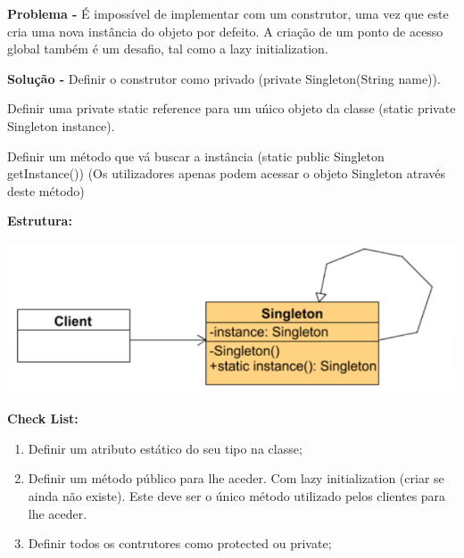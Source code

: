 \documentclass{article}
\begin{document}
\begin{flushleft}
    \textbf{Problema -} É impossível de implementar com um construtor, uma vez que este cria uma nova
    instância do objeto por defeito. A criação de um ponto de acesso global também é
    um desafio, tal como a lazy initialization.

\end{flushleft}

\begin{flushleft}
    \textbf{Solução -} Definir o construtor como privado (private Singleton(String name)).

    Definir uma private static reference para um uńico objeto da classe (static private Singleton instance).

    Definir um método que vá buscar a instância (static public Singleton getInstance())
    (Os utilizadores apenas podem acessar o objeto Singleton através deste método)
\end{flushleft}

\begin{flushleft}
    \textbf{Estrutura:}

    \begin{center}
        \includegraphics[scale=0.4]{Images/34.png}
    \end{center}

\end{flushleft}

\begin{flushleft}
    \textbf{Check List:}

    \begin{enumerate}
        \item Definir um atributo estático do seu tipo na classe;
        \item Definir um método público para lhe aceder. Com lazy initialization (criar se ainda não existe). Este deve ser o único método utilizado pelos clientes para lhe aceder.
        \item Definir todos os contrutores como protected ou private;
    \end{enumerate}
\end{flushleft}
\end{document}
